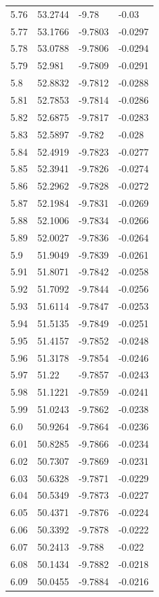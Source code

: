 \begin{tabular}{llll}
5.76 & 53.2744 & -9.78 & -0.03 \\
5.77 & 53.1766 & -9.7803 & -0.0297 \\
5.78 & 53.0788 & -9.7806 & -0.0294 \\
5.79 & 52.981 & -9.7809 & -0.0291 \\
5.8 & 52.8832 & -9.7812 & -0.0288 \\
5.81 & 52.7853 & -9.7814 & -0.0286 \\
5.82 & 52.6875 & -9.7817 & -0.0283 \\
5.83 & 52.5897 & -9.782 & -0.028 \\
5.84 & 52.4919 & -9.7823 & -0.0277 \\
5.85 & 52.3941 & -9.7826 & -0.0274 \\
5.86 & 52.2962 & -9.7828 & -0.0272 \\
5.87 & 52.1984 & -9.7831 & -0.0269 \\
5.88 & 52.1006 & -9.7834 & -0.0266 \\
5.89 & 52.0027 & -9.7836 & -0.0264 \\
5.9 & 51.9049 & -9.7839 & -0.0261 \\
5.91 & 51.8071 & -9.7842 & -0.0258 \\
5.92 & 51.7092 & -9.7844 & -0.0256 \\
5.93 & 51.6114 & -9.7847 & -0.0253 \\
5.94 & 51.5135 & -9.7849 & -0.0251 \\
5.95 & 51.4157 & -9.7852 & -0.0248 \\
5.96 & 51.3178 & -9.7854 & -0.0246 \\
5.97 & 51.22 & -9.7857 & -0.0243 \\
5.98 & 51.1221 & -9.7859 & -0.0241 \\
5.99 & 51.0243 & -9.7862 & -0.0238 \\
6.0 & 50.9264 & -9.7864 & -0.0236 \\
6.01 & 50.8285 & -9.7866 & -0.0234 \\
6.02 & 50.7307 & -9.7869 & -0.0231 \\
6.03 & 50.6328 & -9.7871 & -0.0229 \\
6.04 & 50.5349 & -9.7873 & -0.0227 \\
6.05 & 50.4371 & -9.7876 & -0.0224 \\
6.06 & 50.3392 & -9.7878 & -0.0222 \\
6.07 & 50.2413 & -9.788 & -0.022 \\
6.08 & 50.1434 & -9.7882 & -0.0218 \\
6.09 & 50.0455 & -9.7884 & -0.0216 \\

\end{tabular}
